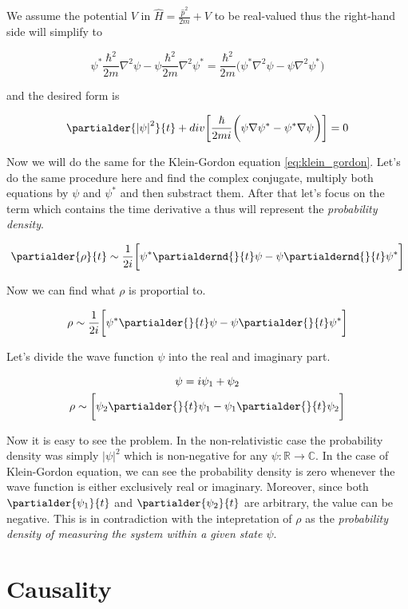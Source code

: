 We assume the potential $V$ in $\hat{H} = \frac{\hat{p}^{2}}{2m} + V$ to be real-valued thus the right-hand side
will simplify to

\begin{equation*}
    \psi^{*} \frac{\hbar^{2}}{2m} \nabla^{2} \psi - \psi \frac{\hbar^{2}}{2m} \nabla^{2} \psi^{*} 
    = \frac{\hbar^{2}}{2m} \bigg( \psi^{*} \nabla^{2} \psi - \psi \nabla^{2} \psi^{*} \bigg)
\end{equation*}

and the desired form is

\begin{equation*}
    \partialder{\left|\psi\right|^{2}}{t} + div \bigg[ \frac{\hbar}{2mi} \bigg( \psi \nabla \psi^{*} - \psi^{*} \nabla \psi \bigg) \bigg] = 0
\end{equation*}

Now we will do the same for the Klein-Gordon equation \ref{eq:klein_gordon}. Let's do the same procedure here and
find the complex conjugate, multiply both equations by $\psi$ and $\psi^{*}$ and then substract them. After that 
let's focus on the term which contains the time derivative a thus will represent the \textit{probability density}.

\begin{equation*}
    \partialder{\rho}{t} \sim \frac{1}{2i} \bigg[ \psi^{*} \partialdernd{}{t} \psi - \psi \partialdernd{}{t} \psi^{*} \bigg]
\end{equation*}

Now we can find what $\rho$ is proportial to. 

\begin{equation}
    \rho \sim \frac{1}{2i} \bigg[ \psi^{*} \partialder{}{t} \psi - \psi \partialder{}{t} \psi^{*} \bigg]
\end{equation}

Let's divide the wave function $\psi$ into the real and imaginary part.

\begin{equation*}
    \begin{gathered}
        \psi = i \psi_{1} + \psi_{2} \\
        \rho \sim \bigg[ \psi_{2} \partialder{}{t} \psi_{1} - \psi_{1} \partialder{}{t} \psi_{2} \bigg]
    \end{gathered}
\end{equation*}

Now it is easy to see the problem. In the non-relativistic case the probability density was simply $|\psi|^{2}$ which is
non-negative for any $\psi: \mathbb{R} \to \mathbb{C}$. In the case of Klein-Gordon equation, we can see the probability 
density is zero whenever the wave function is either exclusively real or imaginary. Moreover, since both 
$\partialder{\psi_{1}}{t}$ and $\partialder{\psi_{2}}{t}$ are arbitrary, the value can be negative. This is in contradiction
with the intepretation of $\rho$ as the \textit{probability density of measuring the system within a given state $\psi$}.

\section{Causality}
